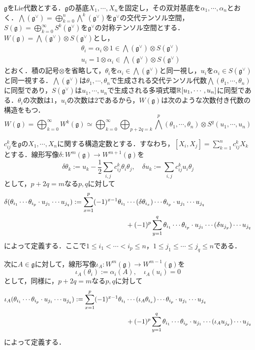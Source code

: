 \begin{eg}
$\mathfrak{g}$をLie代数とする．$\mathfrak{g}$の基底$X_1,\cdots,X_n$を固定し，その双対基底を$\alpha_1,\cdots,\alpha_n$とおく．$\bigwedge(\mathfrak{g}^\vee)=\bigoplus_{k=0}^{n}\bigwedge^k(\mathfrak{g}^\vee)$を$\mathfrak{g}^\vee$の交代テンソル空間，$S(\mathfrak{g})=\bigoplus_{k=0}^\infty S^k(\mathfrak{g}^\vee)$を$\mathfrak{g}^\vee$の対称テンソル空間とする．$W(\mathfrak{g})=\bigwedge(\mathfrak{g}^\vee)\otimes S(\mathfrak{g}^\vee)$とし，
\begin{align*}
  &\theta_i = \alpha_i\otimes 1 \in\bigwedge(\mathfrak{g}^\vee)\otimes S(\mathfrak{g}^\vee)\\
  &u_i = 1\otimes\alpha_i \in\bigwedge(\mathfrak{g}^\vee)\otimes S(\mathfrak{g}^\vee)
\end{align*}
とおく．積の記号$\otimes$を省略して，$\theta_i$を$\alpha_i\in\bigwedge(\mathfrak{g}^\vee)$と同一視し，$u_i$を$\alpha_i\in S(\mathfrak{g}^\vee)$と同一視する．$\bigwedge(\mathfrak{g}^\vee)$は$\theta_1,\cdots,\theta_n$で生成される交代テンソル代数$\bigwedge(\theta_1,\cdots,\theta_n)$に同型であり，$S(\mathfrak{g}^\vee)$は$u_1,\cdots,u_n$で生成される多項式環$\mathbb{R}[u_1,\cdots,u_n]$に同型である．$\theta_i$の次数は$1$，$u_i$の次数は$2$であるから，$W(\mathfrak{g})$は次のような次数付き代数の構造をもつ．
\[
W(\mathfrak{g})= \bigoplus_{k=0}^\infty W^k(\mathfrak{g}) \simeq\bigoplus_{k=0}^\infty\bigoplus_{p+2q=k}\bigwedge^p(\theta_1,\cdots,\theta_n)\otimes S^q(u_1,\cdots,u_n)
\]

$c^k_{ij}$を$\mathfrak{g}$の$X_1,\cdots,X_n$に関する構造定数とする．すなわち，$[X_i,X_j]=\sum_{k=1}^nc^k_{ij}X_k$とする．線形写像$\delta\colon W^m(\mathfrak{g})\rightarrow W^{m+1}(\mathfrak{g})$を
\[
\delta\theta_k := u_k - \frac{1}{2}\sum_{i,j}c^k_{ij}\theta_i\theta_j,\quad \delta u_k := \sum_{i,j}c^k_{ij}u_i\theta_j
\]
として，$p+2q=m$なる$p,q$に対して
\begin{align*}
  \delta(\theta_{i_1}\cdots\theta_{i_p}\cdot u_{j_1}\cdots u_{j_q}) := \sum_{x=1}^p(-1)^{x-1}\theta_{i_1}&\cdots(\delta\theta_{i_x})\cdots\theta_{i_p}\cdot u_{j_1}\cdots u_{j_q} \notag \\ 
  &+ (-1)^p\sum_{y=1}^q\theta_{i_1}\cdots\theta_{i_p}\cdot u_{j_1}\cdots(\delta u_{j_y})\cdots u_{j_q}
\end{align*}
によって定義する．ここで$1\leq i_1<\cdots<i_p\leq n$，$1\leq j_1\leq\cdots\leq j_q\leq n$である．

次に$A\in\mathfrak{g}$に対して，線形写像$\iota_A\colon W^m(\mathfrak{g})\rightarrow W^{m-1}(\mathfrak{g})$を
\[
\iota_A(\theta_i):=\alpha_i(A),\quad \iota_A(u_i)=0
\]
として，同様に，$p+2q=m$なる$p,q$に対して
\begin{align*}
  \iota_A(\theta_{i_1}\cdots\theta_{i_p}\cdot u_{j_1}\cdots u_{j_q}) := \sum_{x=1}^p(-1)^{x-1}\theta_{i_1}&\cdots(\iota_A\theta_{i_x})\cdots\theta_{i_p}\cdot u_{j_1}\cdots u_{j_q} \notag \\ 
  &+ (-1)^p\sum_{y=1}^q\theta_{i_1}\cdots\theta_{i_p}\cdot u_{j_1}\cdots(\iota_A u_{j_y})\cdots u_{j_q}
\end{align*}
によって定義する．


\end{eg}
